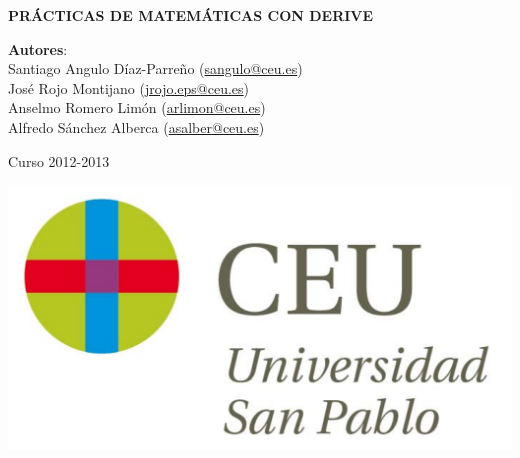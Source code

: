 \documentclass[a4paper,dvips,openright,twoside]{report}
\newcommand{\resetcounters}{\setcounter{page}{1} \setcounter{section}{0} \setcounter{footnote}{0} \setcounter{figure}{0} \setcounter{table}{0}}
\begin{document}
\begin{titlepage}
\vspace*{5cm}
\begin{center}
{\huge \bf PRÁCTICAS DE MATEMÁTICAS CON DERIVE\par}
\vspace{0.5cm}
{\large \noindent \textbf{Autores}: \\
Santiago Angulo Díaz-Parreño (\url{sangulo@ceu.es})\\
José Rojo Montijano (\url{jrojo.eps@ceu.es})\\
Anselmo Romero Limón (\url{arlimon@ceu.es})\\
Alfredo Sánchez Alberca (\url{asalber@ceu.es})
}

\vspace{0.5cm}
{\large Curso 2012-2013}

\vspace{1cm}
 \includegraphics[scale=0.3]{img/logo_uspceu_01}
\end{center}
\end{titlepage}



\tableofcontents
\newpage

\resetcounters



%


%

%
%

%
\end{document}
